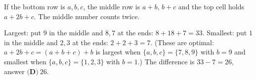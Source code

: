 If the bottom row is $a,b,c$, the middle row is $a+b$, $b+c$ and the top cell holds $a+2b+c$. The middle number counts twice.

Largest: put $9$ in the middle and $8,7$ at the ends: $8+18+7=33$. Smallest: put $1$ in the middle and $2,3$ at the ends: $2+2+3=7$. (These are optimal: $a+2b+c=(a+b+c)+b$ is largest when $\{a,b,c\}=\{7,8,9\}$ with $b=9$ and smallest when $\{a,b,c\}=\{1,2,3\}$ with $b=1$.) The difference is $33-7=26$, answer $\boxed{\textbf{(D)}\ 26}$.
